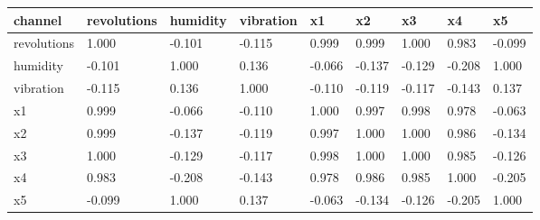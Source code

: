 \begin{tabular}{lllllllll}
\toprule
channel & revolutions & humidity & vibration & x1 & x2 & x3 & x4 & x5 \\
\midrule
revolutions & 1.000 & -0.101 & -0.115 & 0.999 & 0.999 & 1.000 & 0.983 & -0.099 \\
humidity & -0.101 & 1.000 & 0.136 & -0.066 & -0.137 & -0.129 & -0.208 & 1.000 \\
vibration & -0.115 & 0.136 & 1.000 & -0.110 & -0.119 & -0.117 & -0.143 & 0.137 \\
x1 & 0.999 & -0.066 & -0.110 & 1.000 & 0.997 & 0.998 & 0.978 & -0.063 \\
x2 & 0.999 & -0.137 & -0.119 & 0.997 & 1.000 & 1.000 & 0.986 & -0.134 \\
x3 & 1.000 & -0.129 & -0.117 & 0.998 & 1.000 & 1.000 & 0.985 & -0.126 \\
x4 & 0.983 & -0.208 & -0.143 & 0.978 & 0.986 & 0.985 & 1.000 & -0.205 \\
x5 & -0.099 & 1.000 & 0.137 & -0.063 & -0.134 & -0.126 & -0.205 & 1.000 \\
\bottomrule
\end{tabular}
